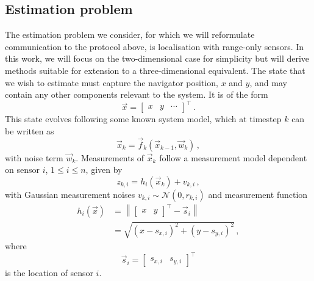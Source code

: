 \subsection{Estimation problem}\label{subsec:nonlin_fusion:estimation_problem}
The estimation problem we consider, for which we will reformulate communication to the protocol above, is localisation with range-only sensors. In this work, we will focus on the two-dimensional case for simplicity but will derive methods suitable for extension to a three-dimensional equivalent. The state that we wish to estimate must capture the navigator position, $x$ and $y$, and may contain any other components relevant to the system. It is of the form
\begin{equation}\label{eq:nonlin_fusion:state_definition}
    \vec{x} = 
    \begin{bmatrix}
        x & y & \cdots
    \end{bmatrix}^\top\,.
\end{equation}
This state evolves following some known system model, which at timestep $k$ can be written as
\begin{equation}\label{eq:nonlin_fusion:system_model}
    \vec{x}_k = \vec{f}_k(\vec{x}_{k-1}, \vec{w}_k)\,,
\end{equation}
with noise term $\vec{w}_k$. Measurements of $\vec{x}_k$ follow a measurement model dependent on sensor $i$, $1\leq i\leq n$, given by 
\begin{equation}\label{eq:nonlin_fusion:measurement_model}
    z_{k,i} = h_i(\vec{x}_k)+v_{k,i}\,,
\end{equation}
with Gaussian measurement noises $v_{k,i} \sim \mathcal{N}(0,r_{k,i})$ and measurement function
\begin{equation}
    \begin{split}
        h_i(\vec{x}) &= \left\lVert
        \begin{bmatrix}
            x & y
        \end{bmatrix}^\top
        - \vec{s}_{i}\right\rVert \\
        &= \sqrt{(x-s_{x,i})^2 + (y-s_{y,i})^2}\,,
    \end{split}
\end{equation}
where
\begin{equation}
    \vec{s}_i = 
    \begin{bmatrix}
        s_{x,i} & s_{y,i}
    \end{bmatrix}^\top
\end{equation} 
is the location of sensor $i$.

